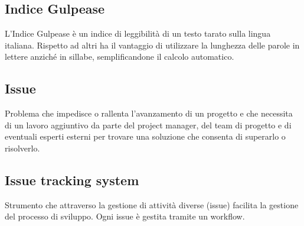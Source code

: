 \documentclass[../glossario.tex]{subfiles}
\begin{document}
\subsection*{Indice Gulpease}
L’Indice Gulpease è un indice di leggibilità di un testo tarato sulla lingua italiana. Rispetto ad altri ha il vantaggio di utilizzare la lunghezza delle parole in lettere anziché in sillabe, semplificandone il calcolo automatico.

\subsection*{Issue} 
Problema che impedisce o rallenta l'avanzamento di un progetto e che necessita di un lavoro aggiuntivo da parte del project manager, del team di progetto e di eventuali esperti esterni per trovare una soluzione che consenta di superarlo o risolverlo.

\subsection*{Issue tracking system} 
Strumento che attraverso la gestione di attività diverse (issue) facilita la gestione del processo di sviluppo. Ogni issue è gestita tramite un workflow.

    
\end{document}

